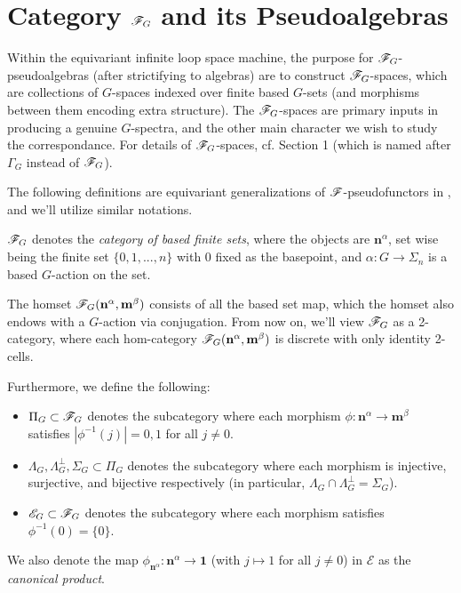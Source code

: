 \documentclass{article}
\begin{document}
\newpage

\section{Category $\mathscr{F}_G$ and its Pseudoalgebras}\label{sec_F_Gm}

Within the equivariant infinite loop space machine, the purpose for $\mathscr{F}_G$-pseudoalgebras (after strictifying to algebras) are to construct $\mathscr{F}_G$-spaces, which are collections of $G$-spaces indexed over finite based $G$-sets (and morphisms between them encoding extra structure). The $\mathscr{F}_G$-spaces are primary inputs in producing a genuine $G$-spectra, and the other main character we wish to study the correspondance. For details of $\mathscr{F}_G$-spaces, cf. \cite{S89} Section 1 (which is named after $\Gamma_G$ instead of $\mathscr{F}_G$).

The following definitions are equivariant generalizations of $\mathscr{F}$-pseudofunctors in \cite{LMRZ26}, and we'll utilize similar notations.

\hfil

\begin{defn}
    $\mathscr{F}_G$ denotes the \emph{category of based finite sets}, where the objects are $\mathbf{n}^\alpha$, set wise being the finite set $\{0,1,...,n\}$ with $0$ fixed as the basepoint, and $\alpha:G\rightarrow\Sigma_n$ is a based $G$-action on the set.

    The homset $\mathscr{F}_G(\mathbf{n}^\alpha,\mathbf{m}^\beta)$ consists of all the based set map, which the homset also endows with a $G$-action via conjugation. From now on, we'll view $\mathscr{F}_G$ as a 2-category, where each hom-category $\mathscr{F}_G(\mathbf{n}^\alpha,\mathbf{m}^\beta)$ is discrete with only identity 2-cells.

    Furthermore, we define the following:
    \begin{itemize}
        \item $\Pi_G\subset \mathscr{F}_G$ denotes the subcategory where each morphism $\phi:\mathbf{n}^\alpha\rightarrow\mathbf{m}^\beta$ satisfies $|\phi^{-1}(j)| = 0,1$ for all $j\neq 0$.
        \item $\Lambda_G,\Lambda_G^\perp,\Sigma_G\subset\Pi_G$ denotes the subcategory where each morphism is injective, surjective, and bijective respectively (in particular, $\Lambda_G\cap \Lambda_G^\perp = \Sigma_G$).
        \item $\mathscr{E}_G\subset \mathscr{F}_G$ denotes the subcategory where each morphism satisfies $\phi^{-1}(0)=\{0\}$.
    \end{itemize}
    We also denote the map $\phi_{\mathbf{n}^\alpha}:\mathbf{n}^\alpha\rightarrow\mathbf{1}$ (with $j\mapsto 1$ for all $j\neq 0$) in $\mathscr{E}$ as the \emph{canonical product}.
\end{defn}
\end{document}

